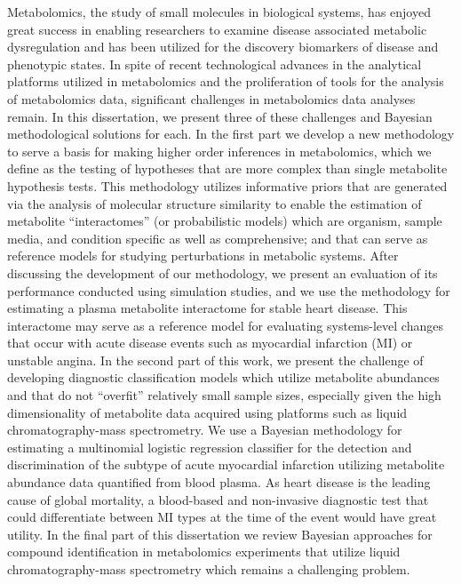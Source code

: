 \documentclass[final]{ulthesis}
\begin{document}
\begin{dissertationabstract}
Metabolomics, the study of small molecules in biological systems, has enjoyed great success in enabling researchers to examine disease associated metabolic dysregulation and has been utilized for the discovery biomarkers of disease and phenotypic states. In spite of recent technological advances in the analytical platforms utilized in metabolomics and the proliferation of tools for the analysis of metabolomics data, significant challenges in metabolomics data analyses remain. In this dissertation, we present three of these challenges and Bayesian methodological solutions for each. In the first part we develop a new methodology to serve a basis for making higher order inferences in metabolomics, which we define as the testing of hypotheses that are more complex than single metabolite hypothesis tests. This methodology utilizes informative priors that are generated via the analysis of molecular structure similarity to enable the estimation of metabolite “interactomes” (or probabilistic models) which are organism, sample media, and condition specific as well as comprehensive; and that can serve as reference models for studying perturbations in metabolic systems. After discussing the development of our methodology, we present an evaluation of its performance conducted using simulation studies, and we use the methodology for estimating a plasma metabolite interactome for stable heart disease. This interactome may serve as a reference model for evaluating systems-level changes that occur with acute disease events such as myocardial infarction (MI) or unstable angina. In the second part of this work, we present the challenge of developing diagnostic classification models which utilize metabolite abundances and that do not “overfit” relatively small sample sizes, especially given the high dimensionality of metabolite data acquired using platforms such as liquid chromatography-mass spectrometry. We use a Bayesian methodology for estimating a multinomial logistic regression classifier for the detection and discrimination of the subtype of acute myocardial infarction utilizing metabolite abundance data quantified from blood plasma. As heart disease is the leading cause of global mortality, a blood-based and non-invasive diagnostic test that could differentiate between MI types at the time of the event would have great utility. In the final part of this dissertation we review Bayesian approaches for compound identification in metabolomics experiments that utilize liquid chromatography-mass spectrometry which remains a challenging problem.
\end{dissertationabstract}
\end{document}
